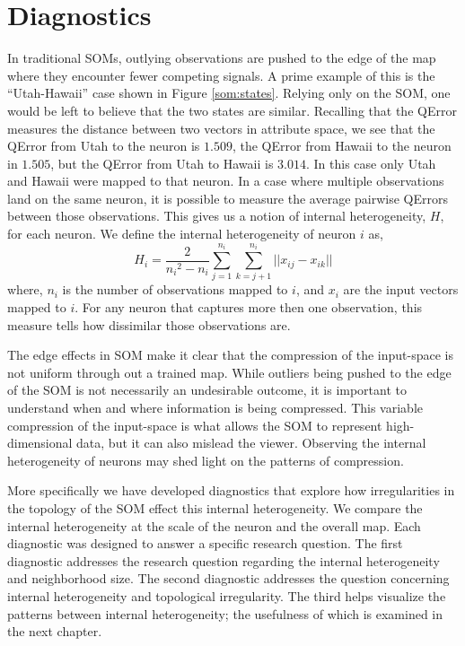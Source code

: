 \section{Diagnostics}
\label{meth:diag}
In traditional SOMs, outlying observations are pushed to the edge of the map
where they encounter fewer competing signals.  A prime example of this is the
``Utah-Hawaii'' case shown in Figure \ref{som:states}.  Relying only on the
SOM, one would be left to believe that the two states are similar.  Recalling
that the QError measures the distance between two vectors in attribute space,
we see that the QError from Utah to the neuron is $1.509$, the QError from
Hawaii to the neuron in $1.505$, but the QError from Utah to Hawaii is
$3.014$. In this case only Utah and Hawaii were mapped to that neuron.  In a
case where multiple observations land on the same neuron, it is possible to
measure the average pairwise QErrors between those observations.  This gives us a
notion of internal heterogeneity, \(H\), for each neuron.  We define the
internal heterogeneity of neuron \(i\) as,
 \begin{equation}
   {H_i} = \frac{2}{{n_i}^2-{n_i}}\sum_{j=1}^{n_i}\sum_{k=j+1}^{n_i} ||{x_{ij}}-{x_{ik}}||
 \label{eqno1}
 \end{equation}
where, \(n_i\) is the number of observations mapped to \(i\), and \(x_i\) are
the input vectors mapped to \(i\).  For any neuron that captures more then one
observation, this measure tells how dissimilar those observations are.

The edge effects in SOM make it clear that the compression of the input-space is
not uniform through out a trained map.  While outliers being pushed to the edge of
the SOM is not necessarily an undesirable outcome, it is important to understand
when and where information is being compressed.  This variable compression of
the input-space is what allows the SOM to represent high-dimensional data, but
it can also mislead the viewer.  Observing the internal heterogeneity of
neurons may shed light on the patterns of compression.  

More specifically we have developed diagnostics that explore how irregularities
in the topology of the SOM effect this internal heterogeneity.  We compare the
internal heterogeneity at the scale of the neuron and the overall map.  Each
diagnostic was designed to answer a specific research question.  The first
diagnostic addresses the research question regarding the internal
heterogeneity and neighborhood size.  The second diagnostic addresses the
question concerning internal heterogeneity and topological irregularity.  The
third helps visualize the patterns between internal heterogeneity; the
usefulness of which is examined in the next chapter.

